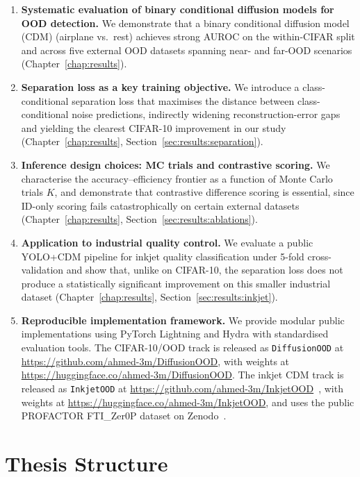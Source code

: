 \begin{enumerate}
    \item \textbf{Systematic evaluation of binary conditional diffusion models for OOD detection.} We demonstrate that a binary conditional diffusion model (CDM) (airplane vs.\ rest) achieves strong AUROC on the within-CIFAR split and across five external OOD datasets spanning near- and far-OOD scenarios (Chapter~\ref{chap:results}).
    \item \textbf{Separation loss as a key training objective.} We introduce a class-conditional separation loss that maximises the distance between class-conditional noise predictions, indirectly widening reconstruction-error gaps and yielding the clearest CIFAR-10 improvement in our study (Chapter~\ref{chap:results}, Section~\ref{sec:results:separation}).
    \item \textbf{Inference design choices: MC trials and contrastive scoring.} We characterise the accuracy--efficiency frontier as a function of Monte Carlo trials $K$, and demonstrate that contrastive difference scoring is essential, since ID-only scoring fails catastrophically on certain external datasets (Chapter~\ref{chap:results}, Section~\ref{sec:results:ablations}).
    \item \textbf{Application to industrial quality control.} We evaluate a public YOLO+CDM pipeline for inkjet quality classification under 5-fold cross-validation and show that, unlike on CIFAR-10, the separation loss does not produce a statistically significant improvement on this smaller industrial dataset (Chapter~\ref{chap:results}, Section~\ref{sec:results:inkjet}).
    \item \textbf{Reproducible implementation framework.} We provide modular public implementations using PyTorch Lightning and Hydra with standardised evaluation tools. The CIFAR-10/OOD track is released as \texttt{DiffusionOOD} at \url{https://github.com/ahmed-3m/DiffusionOOD}, with weights at \url{https://huggingface.co/ahmed-3m/DiffusionOOD}. The inkjet CDM track is released as \texttt{InkjetOOD} at \url{https://github.com/ahmed-3m/InkjetOOD}~\cite{mohammed2026inkjetood}, with weights at \url{https://huggingface.co/ahmed-3m/InkjetOOD}, and uses the public PROFACTOR FTI\_Zer0P dataset on Zenodo~\citep{profactor2024fti}.
\end{enumerate}

\endgroup
\section{Thesis Structure}
\label{sec:intro:outline}
\begingroup
\fontsize{11pt}{13.2pt}\selectfont

